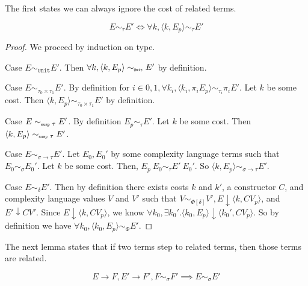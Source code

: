 The first states we can always ignore the cost of related terms.
%
\begin{lemma}
  \label{lem:ignorecost}
\[
  E \sim_\tau E' \Leftrightarrow \forall k, \langle k, E_p \rangle \sim_\tau E'
\]
\end{lemma}
%
\begin{proof}
  We proceed by induction on type.

  Case $E \sim_{\texttt{Unit}} E'$. 
  Then $\forall k, \langle k, E_p \rangle \sim_{\texttt{\tiny{Unit}}} E'$ by definition.

  Case $E \sim_{\tau_0 \times \tau_1} E'$.
  By definition for $i\in{0,1}, \forall k_i, \langle k_i, \pi_i E_p \rangle \sim_{\tau_i} \pi_i E'$.
  Let $k$ be some cost.
  Then $\langle k, E_p \rangle \sim_{\tau_0 \times \tau_1} E'$ by definition.

  Case $E \sim_{\texttt{\tiny{susp }} \tau} E'$.
  By definition $E_p \sim_\tau E'$.
  Let $k$ be some cost.
  Then $\langle k, E_p \rangle \sim_{\texttt{\tiny{susp }} \tau} E'$.

  Case $E \sim_{\sigma \to \tau} E'$.
  Let $E_0, E_0'$ by some complexity language terms such that $E_0 \sim_\sigma E_0'$.
  Let $k$ be some cost.
  Then, $E_p\ E_0 \sim_\tau E'\ E_0'$.
  So $\langle k, E_p \rangle \sim_{\sigma \to \tau} E'$.

  Case $E \sim_\delta E'$.
  Then by definition there exists costs $k$ and $k'$, a constructor $C$, and complexity language values $V$ and $V'$ such that $V \sim_{\Phi[\delta]} V', E \downarrow \langle k, C V_p \rangle$, and $E' \downarrow C V'$.
  Since $E \downarrow \langle k, C V_p \rangle$, we know $\forall k_0, \exists k_0'. \langle k_0, E_p \rangle \downarrow \langle k_0', C V_p \rangle$.
  So by definition we have $\forall k_0, \langle k_0, E_p \rangle \sim_\Phi E'$.
\end{proof}
%
The next lemma states that if two terms step to related terms, then those terms are related.
%
\begin{lemma}
  \label{lem:relatedstepback}
  \[
    E \to F, E' \to F', F \sim_\sigma F' \implies E \sim_\sigma E'
  \]
\end{lemma}
%
